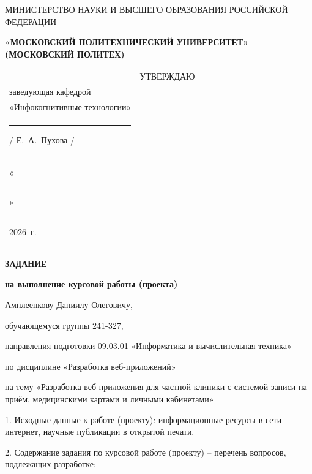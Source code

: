 \documentclass[14pt, a4paper]{extarticle}
\begin{document}
\pagestyle{empty}

\begin{center}
    {\small МИНИСТЕРСТВО НАУКИ И ВЫСШЕГО ОБРАЗОВАНИЯ РОССИЙСКОЙ ФЕДЕРАЦИИ}


    {\small \textbf{«МОСКОВСКИЙ ПОЛИТЕХНИЧЕСКИЙ УНИВЕРСИТЕТ»}} \\
    {\small \textbf{(МОСКОВСКИЙ ПОЛИТЕХ)}}
\end{center}

\begin{tabularx}{\textwidth}{@{} p{} p{} @{}}
     &
    \raggedright
    УТВЕРЖДАЮ                          \\
    заведующая кафедрой                \\
    «Инфокогнитивные технологии»       \\[0.3cm]

    \rule{3cm}{0.4pt} / Е.~А.~Пухова / \\[0.1cm]

    «\rule{0.8cm}{0.4pt}» \rule{3cm}{0.4pt} 2026~г.
\end{tabularx}

\begin{center}

    { \large \textbf{ЗАДАНИЕ}}

    \textbf{на выполнение курсовой работы (проекта)}

    Амплеенкову Даниилу Олеговичу,

\end{center}

обучающемуся группы 241-327,

направления подготовки 09.03.01 «Информатика и вычислительная техника»

по дисциплине «Разработка веб-приложений»

на тему «Разработка веб-приложения для частной клиники с системой записи на приём, медицинскими картами и личными кабинетами»

1. Исходные данные к работе (проекту): информационные ресурсы в сети интернет, научные публикации в открытой печати.

2. Содержание задания по курсовой работе (проекту) -- перечень вопросов, подлежащих разработке:
\end{document}
